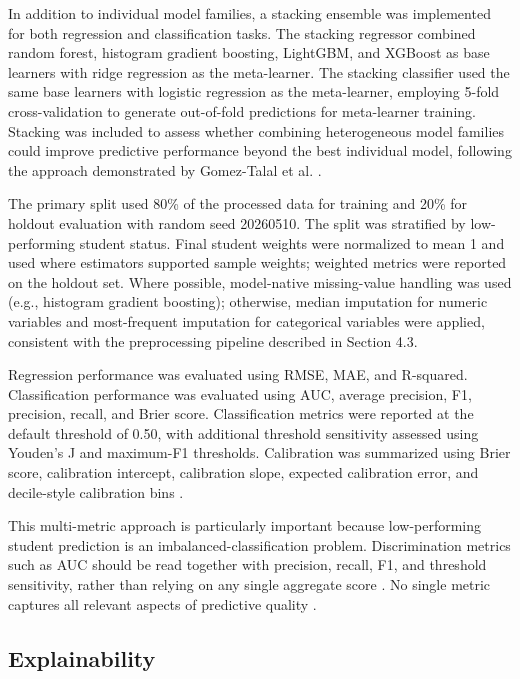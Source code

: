 \documentclass[pdflatex,sn-mathphys-ay]{sn-jnl}
\begin{document}
In addition to individual model families, a stacking ensemble was implemented for both regression and classification tasks. The stacking regressor combined random forest, histogram gradient boosting, LightGBM, and XGBoost as base learners with ridge regression as the meta-learner. The stacking classifier used the same base learners with logistic regression as the meta-learner, employing 5-fold cross-validation to generate out-of-fold predictions for meta-learner training. Stacking was included to assess whether combining heterogeneous model families could improve predictive performance beyond the best individual model, following the approach demonstrated by Gomez-Talal et al. \citep{Gomez_Talal_2025}.

The primary split used 80\% of the processed data for training and 20\% for holdout evaluation with random seed 20260510. The split was stratified by low-performing student status. Final student weights were normalized to mean 1 and used where estimators supported sample weights; weighted metrics were reported on the holdout set. Where possible, model-native missing-value handling was used (e.g., histogram gradient boosting); otherwise, median imputation for numeric variables and most-frequent imputation for categorical variables were applied, consistent with the preprocessing pipeline described in Section 4.3.

Regression performance was evaluated using RMSE, MAE, and R-squared. Classification performance was evaluated using AUC, average precision, F1, precision, recall, and Brier score. Classification metrics were reported at the default threshold of 0.50, with additional threshold sensitivity assessed using Youden's J and maximum-F1 thresholds. Calibration was summarized using Brier score, calibration intercept, calibration slope, expected calibration error, and decile-style calibration bins \citep{Steyerberg_2010}.

This multi-metric approach is particularly important because low-performing student prediction is an imbalanced-classification problem. Discrimination metrics such as AUC should be read together with precision, recall, F1, and threshold sensitivity, rather than relying on any single aggregate score \citep{He_Hu_Garcia_2008,Powers_2011}. No single metric captures all relevant aspects of predictive quality \citep{Ersozlu_2024}.

\FloatBarrier
\subsection{Explainability}
\end{document}
